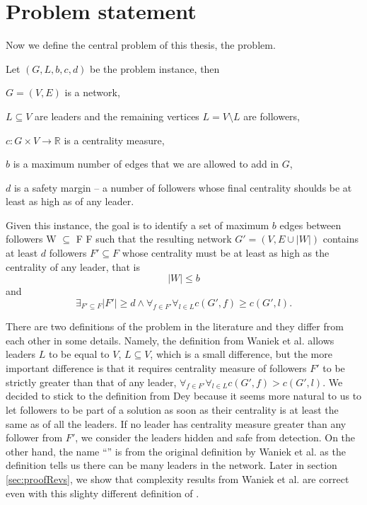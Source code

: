 \chapter{Problem statement}

Now we define the central problem of this thesis, the \HL problem.

\begin{definition}\label{HL}
    Let $(G, L, b, c, d)$ be the problem instance, then
    \begin{description}
        \item $G = (V, E)$ is a network,
        \item $L \subseteq V$ are leaders and the remaining vertices $L = V \setminus L$ are followers,
        \item $c : G \times V \rightarrow \mathbb{R}$ is a centrality measure,
        \item $b$ is a maximum number of edges that we are allowed to add in $G$,
        \item $d$ is a safety margin -- a number of followers whose final centrality shoulds be at least as high as of any leader.
    \end{description}
    Given this instance, the goal is to identify a set of maximum $b$ edges between followers W $\subseteq$ F {\texttimes} F
    such that the resulting network $G' = (V, E \cup |W|)$ contains at least $d$ followers $F' \subseteq F$
    whose centrality must be at least as high as the centrality of any leader, that is
    $$|W| \leq b$$
    and
    $$\exists_{F' \subseteq F} |F'| \geq d \wedge \forall_{f \in F'} \forall_{l \in L} c(G', f) \geq c(G', l).$$
\end{definition}

There are two definitions of the \HL problem in the literature and they differ from each other in some details.
Namely, the definition from Waniek et al. \cite{Waniek2017} allows leaders $L$ to be equal to $V$, $L \subseteq V$,
which is a small difference, but the more important difference is that it requires centrality measure of followers $F'$ to be strictly greater
than that of any leader, $\forall_{f \in F'} \forall_{l \in L} c(G', f) > c(G', l)$.
We decided to stick to the definition from Dey \cite{Dey2019} because it seems more natural to us to let followers to be part of a solution
as soon as their centrality is at least the same as of all the leaders. If no leader has centrality measure greater than any follower from $F'$,
we consider the leaders hidden and safe from detection.
On the other hand, the name ``\HL'' is from the original definition by Waniek et al. as the definition tells us there can be many leaders in the network.
Later in section \ref{sec:proofRevs}, we show that complexity results from Waniek et al.
are correct even with this slighty different definition of \HLshort.
